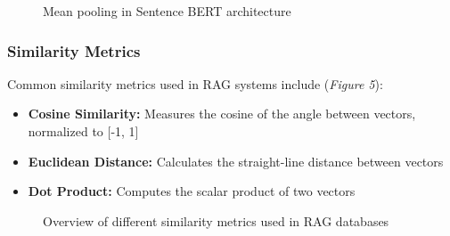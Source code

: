 \documentclass[12pt]{article}
\begin{document}
    \begin{figure}[h!]
        \vspace{1cm}
        \centering
        \caption{Mean pooling in Sentence BERT architecture \cite{prompt_engineering}}
    \end{figure}

    \newpage
    \subsubsection{Similarity Metrics}
    Common similarity metrics used in RAG systems include (\textit{Figure 5}):
    \begin{itemize}
    \item \textbf{Cosine Similarity:} Measures the cosine of the angle between vectors, normalized to [-1, 1]
    \item \textbf{Euclidean Distance:} Calculates the straight-line distance between vectors
    \item \textbf{Dot Product:} Computes the scalar product of two vectors
    \end{itemize}


    \begin{figure}[h!]
        \vspace{1cm}
        \centering
        \caption{Overview of different similarity metrics used in RAG databases}
    \end{figure}
\end{document}
